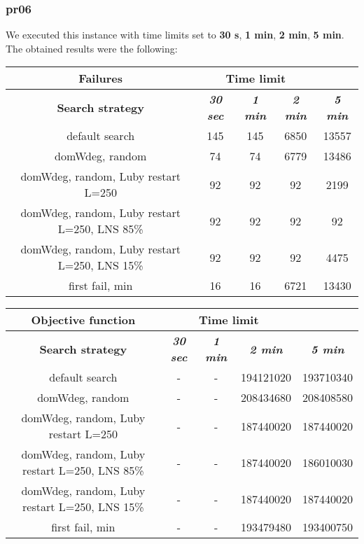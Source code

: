 \subsubsection{pr06}
We executed this instance with time limits set to \textbf{30 s}, \textbf{1 min}, \textbf{2 min}, \textbf{5 min}.\\
The obtained results were the following:
{
\renewcommand{\arraystretch}{2}
\begin{longtable}[h]{| c | c | c | c | c |}
    \hline
    \textbf{Failures} & \multicolumn{3}{c}{Time limit} & \\
    \hline
    \textbf{Search strategy} & \textbf{\textit{30 sec}} & \textbf{\textit{1 min}} & \textbf{\textit{2 min}} & \textbf{\textit{5 min}} \\
    \hline
    \endhead
    default search                                & 145 &  145 &  6850 &  13557 \\
    \hline
    domWdeg, random                               &  74 &   74 &  6779 &  13486 \\
    \hline
    domWdeg, random, Luby restart L=250           &  92 &   92 &   92 &    2199 \\
    \hline
    domWdeg, random, Luby restart L=250, LNS 85\% &  92 &   92 &   92 &      92 \\
    \hline
    domWdeg, random, Luby restart L=250, LNS 15\% &  92 &   92 &   92 &    4475 \\
    \hline
    first fail, min                               &  16 &   16 & 6721 &   13430 \\
    \hline
\end{longtable}
}

{
\renewcommand{\arraystretch}{2}
\begin{longtable}[h]{| c | c | c | c | c |}
    \hline
    \textbf{Objective function} & \multicolumn{3}{c}{Time limit} & \\
    \hline
    \textbf{Search strategy} & \textbf{\textit{30 sec}} & \textbf{\textit{1 min}} & \textbf{\textit{2 min}} & \textbf{\textit{5 min}} \\
    \hline
    \endhead
    default search                                & - & - & 194121020 & 193710340 \\
    \hline
    domWdeg, random                               & - & - & 208434680 & 208408580 \\
    \hline
    domWdeg, random, Luby restart L=250           & - & - & 187440020 & 187440020 \\
    \hline
    domWdeg, random, Luby restart L=250, LNS 85\% & - & - & 187440020 & 186010030 \\
    \hline
    domWdeg, random, Luby restart L=250, LNS 15\% & - & - & 187440020 & 187440020 \\
    \hline
    first fail, min                               & - & - & 193479480 & 193400750 \\
    \hline
\end{longtable}
}